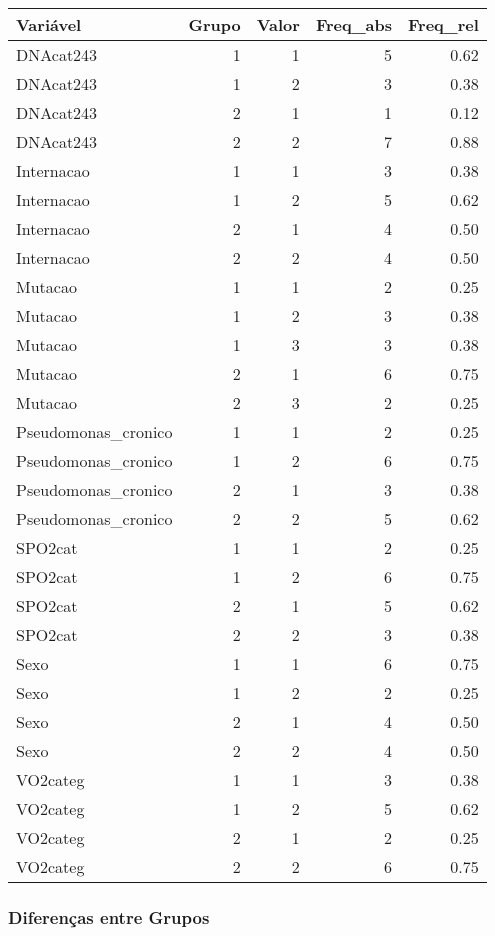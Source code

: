 \documentclass[
]{article}
\begin{document}
\begin{tabular}{l|r|r|r|r}
\hline
Variável & Grupo & Valor & Freq\_abs & Freq\_rel\\
\hline
DNAcat243 & 1 & 1 & 5 & 0.62\\
\hline
DNAcat243 & 1 & 2 & 3 & 0.38\\
\hline
DNAcat243 & 2 & 1 & 1 & 0.12\\
\hline
DNAcat243 & 2 & 2 & 7 & 0.88\\
\hline
Internacao & 1 & 1 & 3 & 0.38\\
\hline
Internacao & 1 & 2 & 5 & 0.62\\
\hline
Internacao & 2 & 1 & 4 & 0.50\\
\hline
Internacao & 2 & 2 & 4 & 0.50\\
\hline
Mutacao & 1 & 1 & 2 & 0.25\\
\hline
Mutacao & 1 & 2 & 3 & 0.38\\
\hline
Mutacao & 1 & 3 & 3 & 0.38\\
\hline
Mutacao & 2 & 1 & 6 & 0.75\\
\hline
Mutacao & 2 & 3 & 2 & 0.25\\
\hline
Pseudomonas\_cronico & 1 & 1 & 2 & 0.25\\
\hline
Pseudomonas\_cronico & 1 & 2 & 6 & 0.75\\
\hline
Pseudomonas\_cronico & 2 & 1 & 3 & 0.38\\
\hline
Pseudomonas\_cronico & 2 & 2 & 5 & 0.62\\
\hline
SPO2cat & 1 & 1 & 2 & 0.25\\
\hline
SPO2cat & 1 & 2 & 6 & 0.75\\
\hline
SPO2cat & 2 & 1 & 5 & 0.62\\
\hline
SPO2cat & 2 & 2 & 3 & 0.38\\
\hline
Sexo & 1 & 1 & 6 & 0.75\\
\hline
Sexo & 1 & 2 & 2 & 0.25\\
\hline
Sexo & 2 & 1 & 4 & 0.50\\
\hline
Sexo & 2 & 2 & 4 & 0.50\\
\hline
VO2categ & 1 & 1 & 3 & 0.38\\
\hline
VO2categ & 1 & 2 & 5 & 0.62\\
\hline
VO2categ & 2 & 1 & 2 & 0.25\\
\hline
VO2categ & 2 & 2 & 6 & 0.75\\
\hline
\end{tabular}

\hypertarget{diferenuxe7as-entre-grupos}{%
\subsubsection{Diferenças entre
Grupos}\label{diferenuxe7as-entre-grupos}}
\end{document}
